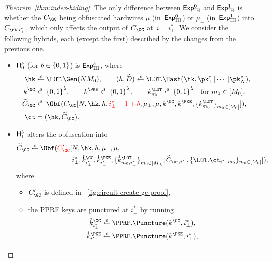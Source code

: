 \begin{figure}

\end{figure}

\begin{proof}
[%
Theorem~\ref{thm:index-hiding}]
The only difference between $\ExpIH{0}$ and $\ExpIH{1}$ is whether the $C_\GC$ being obfuscated hardwires $\mu$ (in~$\ExpIH{0}$) or $\mu_\bot$ (in~$\ExpIH{1}$) into $C_{\ct,i_\bot^\ast}$, which only affects the output of $C_\GC$ at~${i=i_\bot^\ast}$.
We consider the following hybrids, each (except the first) described by the changes from the previous one.
\begin{itemize}
\item $\Hyb_0^b$ (for ${b\in{\{0,1\}}}$) is $\ExpIH{b}$, where
\begin{align*}
\hk&{}\draws\LOT.\Gen(NM_0),\qquad
(h,\widehat{D})\draws\LOT.\Hash(\hk,\pk^\ast_1\concat\cdots\concat\pk^\ast_N),\\
k^\GC&{}\draws\bit^\lambda,\qquad
k^\PKE\draws\bit^\lambda,\qquad
k^\LOT_{m_0}\draws\bit^\lambda\quad\textup{for }m_0\in[M_0],\\
\widetilde{C}_\GC&{}\draws\Obf(C_\GC[
N,\hk,h,{\color{red}i_\bot^\ast-1+b},\mu_\bot,\mu,k^\GC,k^\PKE,\{k^\LOT_{m_0}\}_{m_0\in[M_0]}^\sphantom
]),\\
\ct&{}=(\hk,\widetilde{C}_\GC).
\end{align*}
\item $\Hyb_1^b$ alters the obfuscation into
\begin{align*}
\WideNarrow{}{\hspace*{-1.5em}}
\widetilde{C}_\GC\draws\Obf({\color{red}C_\GC'}[
{}&
N,\hk,h,\mu_\bot,\mu,
\\ &
i_\bot^\ast,
\mathring{k}^\GC_{i_\bot^\ast},
\mathring{k}^\PKE_{i_\bot^\ast},
\{\mathring{k}^\LOT_{m_0,i_\bot^\ast}\}_{m_0\in[M_0]}^\sphantom,
\widehat{C}_{\ct,i_\bot^\ast},
\{\LOT.\ct_{i_\bot^\ast,m_0}\}_{m_0\in[M_0]}
]),
\end{align*}
where
\begin{itemize}
\item $C_\GC'$ is defined in \Figure~\ref{fig:circuit-create-gc-proof},
\item the PPRF keys are punctured at $i_\bot^\ast$ by running
\begin{align*}
\mathring{k}^\GC_{i_\bot^\ast}&{}\draws\PPRF.\Puncture(k^\GC,i_\bot^\ast),\\
\mathring{k}^\PKE_{i_\bot^\ast}&{}\draws\PPRF.\Puncture(k^\PKE,i_\bot^\ast),\\

\end{align*}
\end{itemize}
\end{itemize}
\end{proof}
